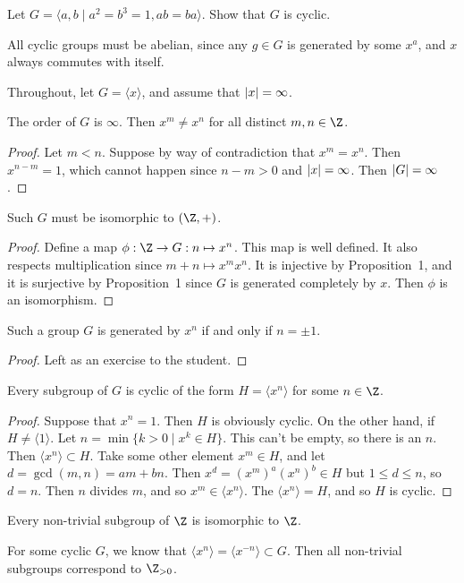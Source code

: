 \begin{problem}
Let $G = \langle a,b \mid a^2 = b^3 = 1, ab = ba \rangle$. Show that $G$ is cyclic.
\end{problem}

\begin{corollary}
All cyclic groups must be abelian, since any $g \in G$ is generated by some $x^a$, and $x$ always commutes with itself.
\end{corollary}

\begin{example}
Throughout, let $G = \langle x \rangle$, and assume that $\abs{x} = \infty$.

\begin{proposition}
The order of $G$ is $\infty$. Then $x^m \not= x^n$ for all distinct $m,n \in \Z$.
\end{proposition}

\begin{proof}
Let $m < n$. Suppose by way of contradiction that $x^m = x^n$. Then $x^{n-m} = 1$, which cannot happen since $n-m > 0$ and $\abs{x} = \infty$. Then $\abs{G} = \infty$.
\end{proof}

\begin{proposition}
Such $G$ must be isomorphic to $(\Z, +)$.
\end{proposition}
\begin{proof}
Define a map $\phi : \Z \to G : n \mapsto x^n$. This map is well defined. It also respects multiplication since $m+n \mapsto x^mx^n$. It is injective by Proposition~1, and it is surjective by Proposition~1 since $G$ is generated completely by $x$. Then $\phi$ is an isomorphism.
\end{proof}

\begin{proposition}
Such a group $G$ is generated by $x^n$ if and only if $n = \pm 1$.
\end{proposition}
\begin{proof}
Left as an exercise to the student.
\end{proof}

\begin{proposition}
Every subgroup of $G$ is cyclic of the form $H = \langle x^n \rangle$ for some $n \in \Z$.
\end{proposition}
\begin{proof}
Suppose that $x^n = 1$. Then $H$ is obviously cyclic. On the other hand, if $H \not= \langle 1 \rangle$. Let $n = \min\{k > 0 \mid x^k \in H\}$. This can't be empty, so there is an $n$. Then $\langle x^n \rangle \subset H$. Take some other element $x^m \in H$, and let $d = \gcd(m,n) = am + bn$. Then $x^d = (x^m)^a(x^n)^b \in H$ but $1 \leq d \leq n$, so $d = n$. Then $n$ divides $m$, and so $x^m \in \langle x^n \rangle$. The $\langle x^n \rangle = H$, and so $H$ is cyclic.
\end{proof}
\end{example}
\begin{corollary}
Every non-trivial subgroup of $\Z$ is isomorphic to $\Z$.
\end{corollary}
\begin{corollary}
For some cyclic $G$, we know that $\langle x^n \rangle = \langle x^{-n} \rangle \subset G$. Then all non-trivial subgroups correspond to $\Z_{>0}$.
\end{corollary}
